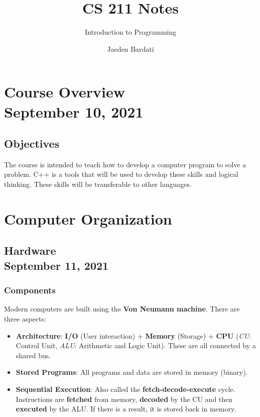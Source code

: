 \documentclass[]{article}
\title{CS 211 Notes}
\subtitle{Introduction to Programming}
\author{Jaeden Bardati}
\begin{document}
\maketitle
\bigbreak

\section{Course Overview\\ {\large \normalfont September 10, 2021}}
\bigbreak

\subsection{Objectives}
\bigbreak

The course is intended to teach how to develop a computer program to solve a problem. C++ is a tools that will be used to develop these skills and logical thinking. These skills will be transferable to other languages.

\section{Computer Organization}
\bigbreak

\subsection{Hardware\\ {\large \normalfont September 11, 2021}}
\bigbreak

\subsubsection{Components}
\bigbreak

Modern computers are built using the \textbf{Von Neumann machine}. There are three aspects:

\begin{itemize}
	\item \textbf{Architecture}: \textbf{I/O} (User interaction) + \textbf{Memory} (Storage) + \textbf{CPU} (\textit{CU}: Control Unit, \textit{ALU}: Arithmetic and Logic Unit). These are all connected by a shared bus.
	\item \textbf{Stored Programs}: All programs and data are stored in memory (binary).
	\item \textbf{Sequential Execution}: Also called the \textbf{fetch-decode-execute} cycle. Instructions are \textbf{fetched} from memory, \textbf{decoded} by the CU and then \textbf{executed} by the ALU. If there is a result, it is stored back in memory. \smallskip
\end{itemize}
\end{document}
